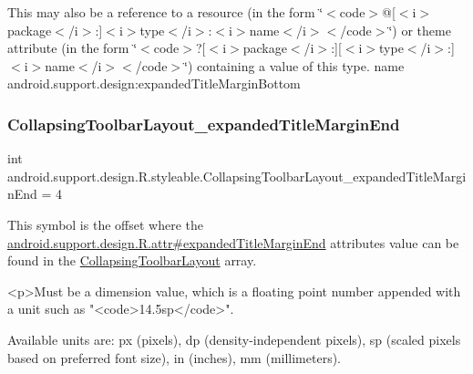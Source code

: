 This may also be a reference to a resource (in the form \char`\"{}$<$code$>$@\mbox{[}$<$i$>$package$<$/i$>$\+:\mbox{]}$<$i$>$type$<$/i$>$\+:$<$i$>$name$<$/i$>$$<$/code$>$\char`\"{}) or theme attribute (in the form \char`\"{}$<$code$>$?\mbox{[}$<$i$>$package$<$/i$>$\+:\mbox{]}\mbox{[}$<$i$>$type$<$/i$>$\+:\mbox{]}$<$i$>$name$<$/i$>$$<$/code$>$\char`\"{}) containing a value of this type.  name android.\+support.\+design\+:expanded\+Title\+Margin\+Bottom \mbox{\label{classandroid_1_1support_1_1design_1_1R_1_1styleable_a35cd54b33a367b2c848a150b8b4c8924}} 
\subsubsection{\texorpdfstring{Collapsing\+Toolbar\+Layout\+\_\+expanded\+Title\+Margin\+End}{CollapsingToolbarLayout\_expandedTitleMarginEnd}}
{\footnotesize\ttfamily int android.\+support.\+design.\+R.\+styleable.\+Collapsing\+Toolbar\+Layout\+\_\+expanded\+Title\+Margin\+End = 4\hspace{0.3cm}{\ttfamily [static]}}

This symbol is the offset where the \hyperlink{classandroid_1_1support_1_1design_1_1R_1_1attr_a27a3f75e044a26272b31b518082425c5}{android.\+support.\+design.\+R.\+attr\#expanded\+Title\+Margin\+End} attribute\textquotesingle{}s value can be found in the \hyperlink{classandroid_1_1support_1_1design_1_1R_1_1styleable_a4a019838b1c3daad84b4ffff397db335}{Collapsing\+Toolbar\+Layout} array.

\begin{DoxyVerb}      <p>Must be a dimension value, which is a floating point number appended with a unit such as "<code>14.5sp</code>".
\end{DoxyVerb}
 Available units are\+: px (pixels), dp (density-\/independent pixels), sp (scaled pixels based on preferred font size), in (inches), mm (millimeters). 

